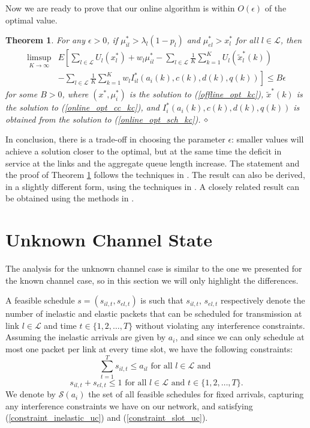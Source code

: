 \documentclass[conference]{IEEEtran}
\newtheorem{theorem}{Theorem}
\begin{document}
Now we are ready to prove that our online algorithm is within $O(\epsilon)$ of the optimal value.
\begin{theorem}
\label{optimality_online_kc}
For any $\epsilon >0$, if $\mu^*_{il} > \lambda_l(1-p_l)$ and $\mu^*_{el} > x_l^*$ for all $l \in \mathcal{L}$, then
\begin{align*}
	\limsup_{K \rightarrow \infty} & E \left[ \sum_{l \in \mathcal{L}} U_l(x_l^*) + w_l \mu^*_{il} - \sum_{l \in \mathcal{L}} \frac{1}{K} \sum_{k=1}^K U_l(\tilde{x}_l^*(k)) \right. \\
	& \left. - \sum_{l \in \mathcal{L}} \frac{1}{K} \sum_{k=1}^K w_l I_{il}^*(a_i(k),c(k),d(k),q(k)) \right] \leq B \epsilon
\end{align*}
for some $B>0$, where $(x^*, \mu_i^*)$ is the solution to (\ref{offline_opt_kc}), $\tilde{x}^*(k)$ is the solution to (\ref{online_opt_cc_kc}), and $I_i^*(a_i(k),c(k),d(k),q(k))$ is obtained from the solution to (\ref{online_opt_sch_kc}).
$\hfill \diamond$
\end{theorem}

In conclusion, there is a trade-off in choosing the parameter $\epsilon$: smaller values will achieve a solution closer to the optimal, but at the same time the deficit in service at the links and the aggregate queue length increase. The statement and the proof of Theorem \ref{optimality_online_kc} follows the techniques in \cite{Neely05}. The result can also be derived, in a slightly different form, using the techniques in \cite{Stolyar05}. A closely related result can be obtained using the methods in \cite{Eryilmaz05}.

\section{Unknown Channel State}
\label{unknown_channel_case}

The analysis for the unknown channel case is similar to the one we presented for the known channel case, so in this section we will only highlight the differences.

A feasible schedule $s=( s_{il,t}, s_{el,t} )$ is such that $s_{il,t}$, $s_{el,t}$ respectively denote the number of inelastic and elastic packets that can be scheduled for transmission at link $l \in \mathcal{L}$ and time $t \in \{ 1, 2, \ldots, T \}$ without violating any interference constraints. Assuming the inelastic arrivals are given by $a_i$, and since we can only schedule at most one packet per link at every time slot, we have the following constraints:
\begin{equation}
\label{constraint_inelastic_uc}
 \sum_{t=1}^{T} s_{il,t} \leq a_{il} \mbox{ for all } l \in \mathcal{L} \mbox{ and }
\end{equation}
\begin{equation}
\label{constraint_slot_uc}
 s_{il,t} + s_{el,t} \leq 1 \mbox{ for all } l \in \mathcal{L} \mbox{ and } t \in \{ 1, 2, \ldots, T \}.
\end{equation}
We denote by $\mathcal{S}(a_i)$ the set of all feasible schedules for fixed arrivals, capturing any interference constraints we have on our network, and satisfying (\ref{constraint_inelastic_uc}) and (\ref{constraint_slot_uc}).
\end{document}
